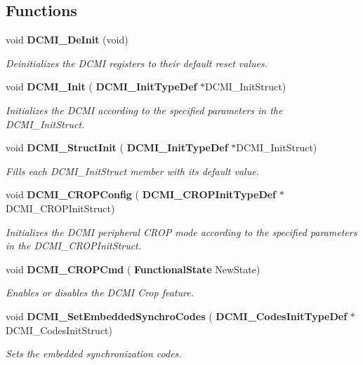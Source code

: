 \subsection*{Functions}
\begin{DoxyCompactItemize}
\item 
void \textbf{ D\+C\+M\+I\+\_\+\+De\+Init} (void)
\begin{DoxyCompactList}\small\item\em Deinitializes the D\+C\+MI registers to their default reset values. \end{DoxyCompactList}\item 
void \textbf{ D\+C\+M\+I\+\_\+\+Init} (\textbf{ D\+C\+M\+I\+\_\+\+Init\+Type\+Def} $\ast$D\+C\+M\+I\+\_\+\+Init\+Struct)
\begin{DoxyCompactList}\small\item\em Initializes the D\+C\+MI according to the specified parameters in the D\+C\+M\+I\+\_\+\+Init\+Struct. \end{DoxyCompactList}\item 
void \textbf{ D\+C\+M\+I\+\_\+\+Struct\+Init} (\textbf{ D\+C\+M\+I\+\_\+\+Init\+Type\+Def} $\ast$D\+C\+M\+I\+\_\+\+Init\+Struct)
\begin{DoxyCompactList}\small\item\em Fills each D\+C\+M\+I\+\_\+\+Init\+Struct member with its default value. \end{DoxyCompactList}\item 
void \textbf{ D\+C\+M\+I\+\_\+\+C\+R\+O\+P\+Config} (\textbf{ D\+C\+M\+I\+\_\+\+C\+R\+O\+P\+Init\+Type\+Def} $\ast$D\+C\+M\+I\+\_\+\+C\+R\+O\+P\+Init\+Struct)
\begin{DoxyCompactList}\small\item\em Initializes the D\+C\+MI peripheral C\+R\+OP mode according to the specified parameters in the D\+C\+M\+I\+\_\+\+C\+R\+O\+P\+Init\+Struct. \end{DoxyCompactList}\item 
void \textbf{ D\+C\+M\+I\+\_\+\+C\+R\+O\+P\+Cmd} (\textbf{ Functional\+State} New\+State)
\begin{DoxyCompactList}\small\item\em Enables or disables the D\+C\+MI Crop feature. \end{DoxyCompactList}\item 
void \textbf{ D\+C\+M\+I\+\_\+\+Set\+Embedded\+Synchro\+Codes} (\textbf{ D\+C\+M\+I\+\_\+\+Codes\+Init\+Type\+Def} $\ast$D\+C\+M\+I\+\_\+\+Codes\+Init\+Struct)
\begin{DoxyCompactList}\small\item\em Sets the embedded synchronization codes. \end{DoxyCompactList}\item 

\end{DoxyCompactItemize}
